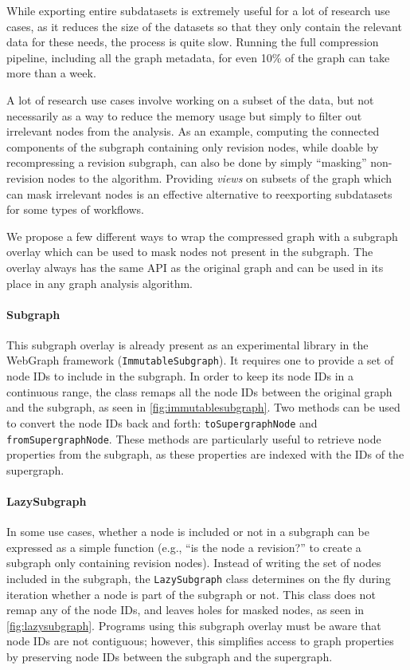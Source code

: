 While exporting entire subdatasets is extremely useful for a lot of research
use cases, as it reduces the size of the datasets so that they only contain the
relevant data for these needs, the process is quite slow. Running the full
compression pipeline, including all the graph metadata, for even 10\% of the
graph can take more than a week.

A lot of research use cases involve working on a subset of the data, but not
necessarily as a way to reduce the memory usage but simply to filter out
irrelevant nodes from the analysis. As an example, computing the connected
components of the subgraph containing only revision nodes, while doable by
recompressing a revision subgraph, can also be done by simply ``masking''
non-revision nodes to the algorithm. Providing \emph{views} on subsets of the
graph which can mask irrelevant nodes is an effective alternative to
reexporting subdatasets for some types of workflows.

We propose a few different ways to wrap the compressed graph with a subgraph
overlay which can be used to mask nodes not present in the subgraph. The
overlay always has the same API as the original graph and can be used in its
place in any graph analysis algorithm.

\paragraph{Subgraph}
This subgraph overlay is already present as an experimental library in the
WebGraph framework (\texttt{ImmutableSubgraph}). It requires one to provide a
set of node IDs to include in the subgraph. In order to keep its node IDs in a
continuous range, the class remaps all the node IDs between the original graph
and the subgraph, as seen in \cref{fig:immutablesubgraph}. Two methods can be
used to convert the node IDs back and forth: \texttt{toSupergraphNode} and
\texttt{fromSupergraphNode}. These methods are particularly useful to retrieve
node properties from the subgraph, as these properties are indexed with the IDs
of the supergraph.


\paragraph{LazySubgraph}
In some use cases, whether a node is included or not in a subgraph can be
expressed as a simple function (e.g., ``is the node a revision?'' to create a
subgraph only containing revision nodes). Instead of writing the set of nodes
included in the subgraph, the \texttt{LazySubgraph} class determines on the fly
during iteration whether a node is part of the subgraph or not. This class does
not remap any of the node IDs, and leaves holes for masked nodes, as seen in
\cref{fig:lazysubgraph}. Programs using this subgraph overlay must be aware
that node IDs are not contiguous; however, this simplifies access to graph
properties by preserving node IDs between the subgraph and the supergraph.

